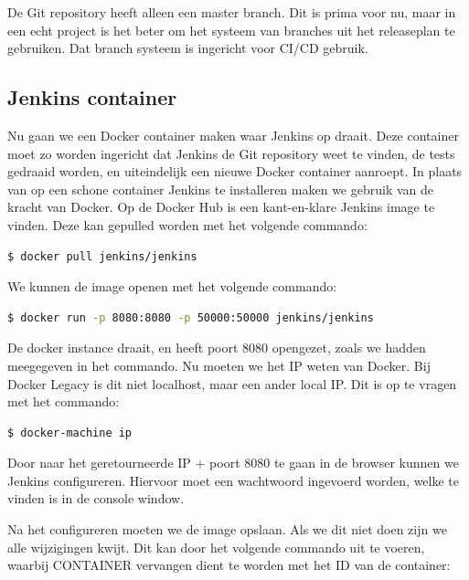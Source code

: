 \documentclass[12pt]{article}
\begin{document}
De Git repository heeft alleen een master branch. Dit is prima voor nu, maar in een echt project is het beter om het systeem van branches uit het releaseplan te gebruiken. Dat branch systeem is ingericht voor CI/CD gebruik.

\subsection{Jenkins container}
Nu gaan we een Docker container maken waar Jenkins op draait. Deze container moet zo worden ingericht dat Jenkins de Git repository weet te vinden, de tests gedraaid worden, en uiteindelijk een nieuwe Docker container aanroept.
\linebreak
In plaats van op een schone container Jenkins te installeren maken we gebruik van de kracht van Docker. Op de Docker Hub is een kant-en-klare Jenkins image te vinden. Deze kan gepulled worden met het volgende commando:

\begin{lstlisting}[language=Bash]
    $ docker pull jenkins/jenkins
\end{lstlisting}

\noindent We kunnen de image openen met het volgende commando:

\begin{lstlisting}[language=Bash]
    $ docker run -p 8080:8080 -p 50000:50000 jenkins/jenkins
\end{lstlisting}

\noindent De docker instance draait, en heeft poort 8080 opengezet, zoals we hadden meegegeven in het commando. Nu moeten we het IP weten van Docker. Bij Docker Legacy is dit niet localhost, maar een ander local IP. Dit is op te vragen met het commando:

\begin{lstlisting}[language=Bash]
    $ docker-machine ip
\end{lstlisting}

\noindent Door naar het geretourneerde IP + poort 8080 te gaan in de browser kunnen we Jenkins configureren. Hiervoor moet een wachtwoord ingevoerd worden, welke te vinden is in de console window.


Na het configureren moeten we de image opslaan. Als we dit niet doen zijn we alle wijzigingen kwijt. Dit kan door het volgende commando uit te voeren, waarbij CONTAINER vervangen dient te worden met het ID van de container:
\end{document}
